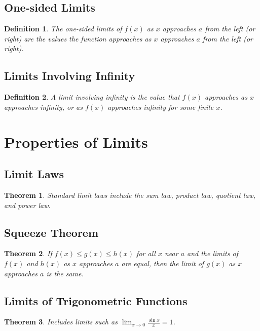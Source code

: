 \documentclass[a4paper,12pt]{book}
\newtheorem{theorem}{Theorem}
\newtheorem{definition}{Definition}
\begin{document}
\subsection{One-sided Limits}
\begin{definition}
The one-sided limits of \( f(x) \) as \( x \) approaches \( a \) from the left (or right) are the values the function approaches as \( x \) approaches \( a \) from the left (or right).
\end{definition}

\subsection{Limits Involving Infinity}
\begin{definition}
A limit involving infinity is the value that \( f(x) \) approaches as \( x \) approaches infinity, or as \( f(x) \) approaches infinity for some finite \( x \).
\end{definition}

\section{Properties of Limits}
\subsection{Limit Laws}
\begin{theorem}
Standard limit laws include the sum law, product law, quotient law, and power law.
\end{theorem}

\subsection{Squeeze Theorem}
\begin{theorem}
If \( f(x) \leq g(x) \leq h(x) \) for all \( x \) near \( a \) and the limits of \( f(x) \) and \( h(x) \) as \( x \) approaches \( a \) are equal, then the limit of \( g(x) \) as \( x \) approaches \( a \) is the same.
\end{theorem}

\subsection{Limits of Trigonometric Functions}
\begin{theorem}
Includes limits such as \( \lim_{x \to 0} \frac{\sin x}{x} = 1 \).
\end{theorem}
\end{document}

